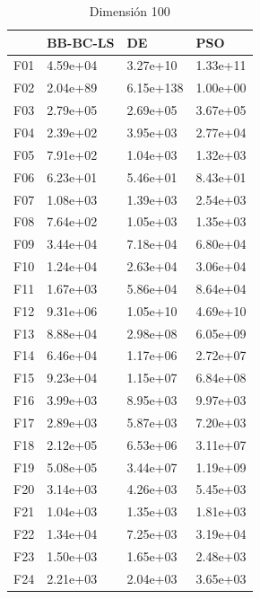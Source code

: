 \begin{table}[H]
\begin{minipage}{.5\linewidth}
    \end{minipage}%
    \begin{minipage}{.5\linewidth}
      \centering
      \caption{Dimensión 100}
      \begin{tabular}{llll}
        \toprule
        {} &  BB-BC-LS &         DE &       PSO \\
        \midrule
        F01  &  4.59e+04 &   3.27e+10 &  1.33e+11 \\
        F02  &  2.04e+89 &  6.15e+138 &  1.00e+00 \\
        F03  &  2.79e+05 &   2.69e+05 &  3.67e+05 \\
        F04  &  2.39e+02 &   3.95e+03 &  2.77e+04 \\
        F05  &  7.91e+02 &   1.04e+03 &  1.32e+03 \\
        F06  &  6.23e+01 &   5.46e+01 &  8.43e+01 \\
        F07  &  1.08e+03 &   1.39e+03 &  2.54e+03 \\
        F08  &  7.64e+02 &   1.05e+03 &  1.35e+03 \\
        F09  &  3.44e+04 &   7.18e+04 &  6.80e+04 \\
        F10  &  1.24e+04 &   2.63e+04 &  3.06e+04 \\
        F11  &  1.67e+03 &   5.86e+04 &  8.64e+04 \\
        F12  &  9.31e+06 &   1.05e+10 &  4.69e+10 \\
        F13  &  8.88e+04 &   2.98e+08 &  6.05e+09 \\
        F14  &  6.46e+04 &   1.17e+06 &  2.72e+07 \\
        F15  &  9.23e+04 &   1.15e+07 &  6.84e+08 \\
        F16  &  3.99e+03 &   8.95e+03 &  9.97e+03 \\
        F17  &  2.89e+03 &   5.87e+03 &  7.20e+03 \\
        F18  &  2.12e+05 &   6.53e+06 &  3.11e+07 \\
        F19  &  5.08e+05 &   3.44e+07 &  1.19e+09 \\
        F20  &  3.14e+03 &   4.26e+03 &  5.45e+03 \\
        F21  &  1.04e+03 &   1.35e+03 &  1.81e+03 \\
        F22  &  1.34e+04 &   7.25e+03 &  3.19e+04 \\
        F23  &  1.50e+03 &   1.65e+03 &  2.48e+03 \\
        F24  &  2.21e+03 &   2.04e+03 &  3.65e+03 \\

\end{tabular}
\end{minipage}
\end{table}
